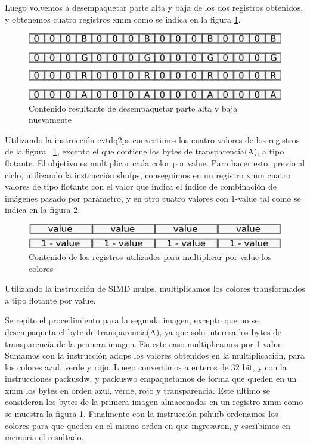 \documentclass[a4paper]{article}
\begin{document}
Luego volvemos a desempaquetar parte alta y baja de los dos registros obtenidos, y obtenemos cuatro registros xmm como se indica en la figura \ref{cuartoXmm}.


\begin{figure}[H]
\centering
\includegraphics[scale=0.8]{imagenes/cuartoXmm.png}
\caption{Contenido resultante de desempaquetar parte alta y baja nuevamente}
\label{cuartoXmm}
\end{figure}

Utilizando la instrucción cvtdq2ps convertimos los cuatro valores de los registros de la figura ~\ref{cuartoXmm}, excepto el que contiene los bytes de transparencia(A), a tipo flotante. El objetivo es multiplicar cada color por value. Para hacer esto, previo al ciclo, utilizando la instrucción shufps, conseguimos en un registro xmm cuatro valores de tipo flotante con el valor que indica el índice de combinación de imágenes pasado por parámetro, y en otro cuatro valores con 1-value tal como se indica en la figura \ref{value}.

\begin{figure}[H]
\centering
\includegraphics[scale=0.8]{imagenes/value.png}
\caption{Contenido de los registros utilizados para multiplicar por value los colores}
\label{value}
\end{figure}


Utilizando la instrucción de SIMD mulps, multiplicamos los colores transformados a tipo flotante por value.

Se repite el procedimiento para la segunda imagen, excepto que no se desempaqueta el byte de transparencia(A), ya que solo interesa los bytes de transparencia de la primera imagen. En este caso multiplicamos por 1-value. Sumamos con la instrucción addps los valores obtenidos en la multiplicación, para los colores azul, verde y rojo. Luego convertimos a enteros de 32 bit, y con la instrucciones packusdw, y packuswb empaquetamos de forma que queden en un xmm los bytes en orden azul, verde, rojo y transparencia. Este ultimo se consideran los bytes de la primera imagen almacenados en un registro xmm como se muestra la figura \ref{cuartoXmm}. Finalmente con la instrucción pshufb ordenamos los colores para que queden en el mismo orden en que ingresaron, y escribimos en memoria el resultado.
\end{document}
